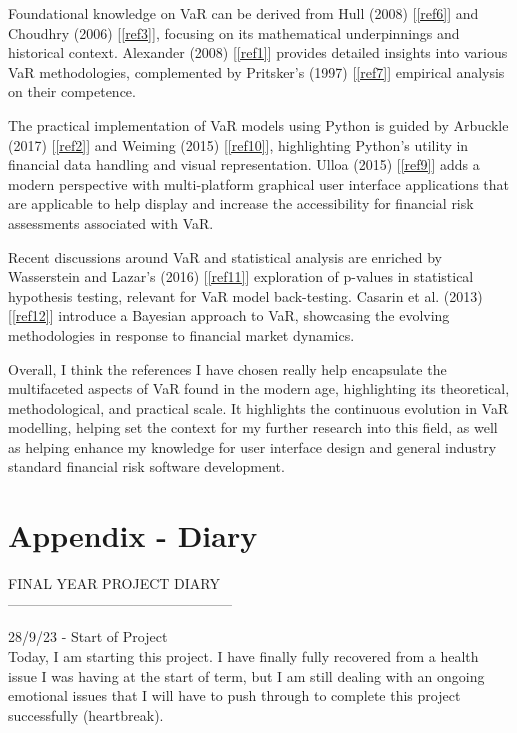 \documentclass{article}
\begin{document}
Foundational knowledge on VaR can be derived from Hull (2008) [\ref{ref6}] and Choudhry (2006) [\ref{ref3}], focusing on its mathematical underpinnings and historical context. Alexander (2008) [\ref{ref1}] provides detailed insights into various VaR methodologies, complemented by Pritsker's (1997) [\ref{ref7}] empirical analysis on their competence.\\\vspace{0.3cm}

The practical implementation of VaR models using Python is guided by Arbuckle (2017) [\ref{ref2}] and Weiming (2015) [\ref{ref10}], highlighting Python's utility in financial data handling and visual representation. Ulloa (2015) [\ref{ref9}]  adds a modern perspective with multi-platform graphical user interface applications that are applicable to help display and increase the accessibility for financial risk assessments associated with VaR.\\\vspace{0.3cm}

Recent discussions around VaR and statistical analysis are enriched by Wasserstein and Lazar's (2016) [\ref{ref11}] exploration of p-values in statistical hypothesis testing, relevant for VaR model back-testing. Casarin et al. (2013) [\ref{ref12}] introduce a Bayesian approach to VaR, showcasing the evolving methodologies in response to financial market dynamics.\\\vspace{0.3cm}

Overall, I think the references I have chosen really help encapsulate the multifaceted aspects of VaR found in the modern age, highlighting its theoretical, methodological, and practical scale. It highlights the continuous evolution in VaR modelling, helping set the context for my further research into this field, as well as helping enhance my knowledge for user interface design and general industry standard financial risk software development.

\section{Appendix - Diary}
FINAL YEAR PROJECT DIARY\\
 ------------------------------------------------

28/9/23 - Start of Project\\
Today, I am starting this project. I have finally fully recovered from a health issue I was having at the start of term, but I am still dealing with an ongoing emotional issues that I will have to push through to complete this project successfully (heartbreak).\\\vspace{0.3cm}
\end{document}
